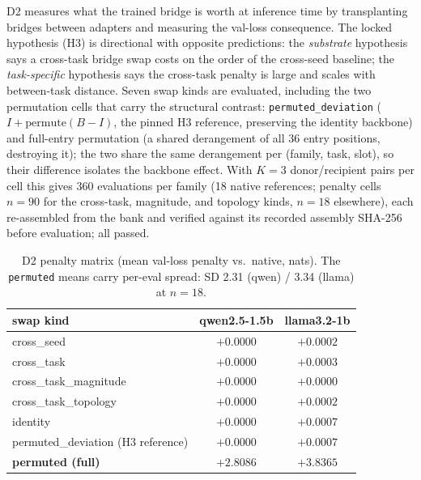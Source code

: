 \documentclass[10pt]{article}
\begin{document}
D2 measures what the trained bridge is worth at inference time by
transplanting bridges between adapters and measuring the val-loss
consequence. The locked hypothesis (H3) is directional with opposite
predictions: the \emph{substrate} hypothesis says a cross-task bridge swap
costs on the order of the cross-seed baseline; the \emph{task-specific}
hypothesis says the cross-task penalty is large and scales with between-task
distance. Seven swap kinds are evaluated, including the two permutation
cells that carry the structural contrast: \texttt{permuted\_deviation}
($I + \mathrm{permute}(B - I)$, the pinned H3 reference, preserving the
identity backbone) and full-entry permutation (a shared derangement of all
36 entry positions, destroying it); the two share the same derangement per
(family, task, slot), so their difference isolates the backbone effect.
With $K = 3$ donor/recipient pairs per cell this gives 360 evaluations per
family (18 native references; penalty cells $n = 90$ for the cross-task,
magnitude, and topology kinds, $n = 18$ elsewhere), each re-assembled from
the bank and verified against its recorded assembly SHA-256 before
evaluation; all passed.

\begin{table}[ht]
\centering
\caption{D2 penalty matrix (mean val-loss penalty vs.\ native, nats). The
\texttt{permuted} means carry per-eval spread: SD 2.31 (qwen) / 3.34
(llama) at $n = 18$.}
\label{tab:d2}
\small
\begin{tabular}{lcc}
\toprule
swap kind & qwen2.5-1.5b & llama3.2-1b \\
\midrule
cross\_seed & $+0.0000$ & $+0.0002$ \\
cross\_task & $+0.0000$ & $+0.0003$ \\
cross\_task\_magnitude & $+0.0000$ & $+0.0000$ \\
cross\_task\_topology & $+0.0000$ & $+0.0002$ \\
identity & $+0.0000$ & $+0.0007$ \\
permuted\_deviation (H3 reference) & $+0.0000$ & $+0.0007$ \\
\textbf{permuted (full)} & $\mathbf{+2.8086}$ & $\mathbf{+3.8365}$ \\
\bottomrule
\end{tabular}
\end{table}
\end{document}
